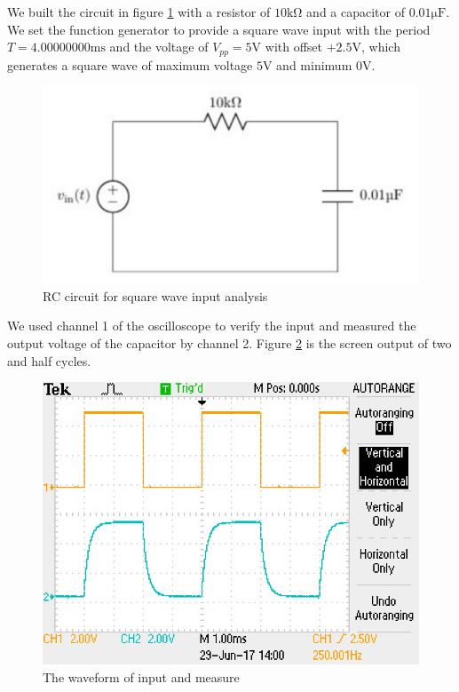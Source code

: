 \hfill \newline
\phantom{ } We built the circuit in figure \ref{fig:cir} with a resistor of $10\mathrm{k\Omega}$ and a capacitor of
$0.01\mathrm{\mu F}$. We set the function generator to provide a square wave input with the period $T=4.00000000\mathrm{ms}$ and the voltage of $V_{pp}=5\mathrm{V}$ with offset $+2.5\mathrm{V}$, which generates a square wave of maximum voltage $5\mathrm{V}$ and minimum $0\mathrm{V}$.

\begin{figure}[!htbp]
	\centering
	\includegraphics[width=\linewidth]{images/circuit.PNG}
	\caption{RC circuit for square wave input analysis}
	\label{fig:cir}
\end{figure}

We used channel 1 of the oscilloscope to verify the input and measured the output voltage of the capacitor by channel 2. Figure \ref{fig:osc1} is the screen output of two and half cycles.

\begin{figure}[!htbp]
	\centering
	\includegraphics[width=0.95\linewidth]{images/osc1.JPG}
	\caption{The waveform of input and measure}
	\label{fig:osc1}
\end{figure}


